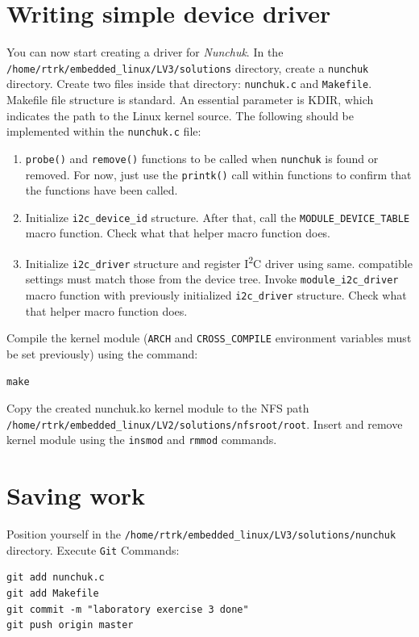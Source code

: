 \documentclass[11pt]{article}
\begin{document}
\section{Writing simple device driver}
You can now start creating a driver for \textit{Nunchuk}. In the
\texttt{/home/rtrk/embedded\_linux/LV3/solutions} directory, create a
\texttt{nunchuk} directory. Create two files inside that directory:
 \texttt{nunchuk.c} and \texttt{Makefile}.
\newline
\newline
Makefile file structure is standard. An essential parameter is KDIR, which
 indicates the path to the Linux kernel source.
\newline
\newline
The following should be implemented within the \texttt{nunchuk.c} file:
\begin{enumerate}
	\item \texttt{probe()} and \texttt{remove()} functions to be called when
		\texttt{nunchuk} is found or removed. For now, just use the
		\texttt{printk()} call within functions to confirm that the functions
		have been called.
	\item Initialize \texttt{i2c\_device\_id} structure. After that, call the
		\texttt{MODULE\_DEVICE\_TABLE} macro function. Check what that helper
		macro function does.
	\item Initialize \texttt{i2c\_driver} structure and register
		I\textsuperscript{2}C driver using same. compatible settings must match
		those from the device tree. Invoke \texttt{module\_i2c\_driver} macro
		function with previously initialized \texttt{i2c\_driver} structure.
		Check what that helper macro function does.
\end{enumerate}
Compile the kernel module (\texttt{ARCH} and \texttt{CROSS\_COMPILE} environment
 variables must be set previously) using the command:
\begin{lstlisting}
make
\end{lstlisting}
Copy the created nunchuk.ko kernel module to the NFS path\\
\texttt{/home/rtrk/embedded\_linux/LV2/solutions/nfsroot/root}. Insert and
 remove kernel module using the \texttt{insmod} and \texttt{rmmod} commands.

\section{Saving work}
Position yourself in the \texttt{/home/rtrk/embedded\_linux/LV3/solutions/nunchuk}
 directory.
Execute \texttt{Git} Commands:
\begin{lstlisting}
git add nunchuk.c
git add Makefile
git commit -m "laboratory exercise 3 done"
git push origin master
\end{lstlisting}
\end{document}
